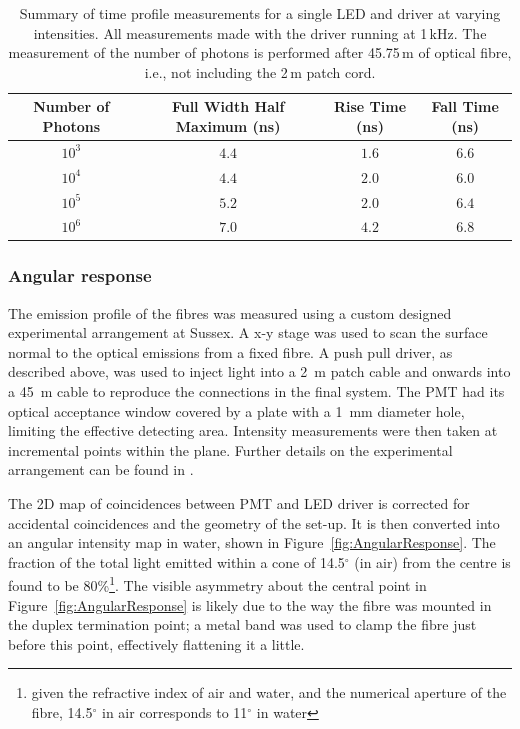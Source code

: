 \documentclass[12pt]{report}
\begin{document}
\begin{table}[t]
	\centering
	\begin{tabular}{| c | c | c | c |}
		\hline                        
		Number of Photons & Full Width Half Maximum (ns) & Rise Time (ns) & Fall Time (ns) \\ \hline \hline
		$10^{3}$ & $4.4$   & $1.6$ & $6.6$\\ \hline
		$10^{4}$ &$4.4$   & $2.0$ & $6.0$\\ \hline
		$10^{5}$ &$5.2$   & $2.0$ & $6.4$\\ \hline
		$10^{6}$ &$7.0$   & $4.2$ & $6.8$\\ \hline
	\end{tabular}
	\caption{Summary of time profile measurements for a single LED and driver at varying intensities. 
			All measurements made with the driver running at 1\,kHz. The measurement of the number of photons is performed after 45.75\,m of optical fibre, i.e., not including the 2\,m patch cord.}
	\label{tab:ixld} 
\end{table}

\subsubsection{Angular response}
The emission profile of the fibres was measured using a custom designed experimental arrangement at Sussex. A x-y stage was used to scan the surface normal to the optical emissions from a fixed fibre. A push pull driver, as described above, was used to inject light into a 2~m patch cable and onwards into a 45~m cable to reproduce the connections in the final system. The PMT had its optical acceptance window covered by a plate with a 1~mm diameter hole, limiting the effective detecting area. Intensity measurements were then taken at incremental points within the plane. Further details on the experimental arrangement can be found in \cite{Sinclair}. 

The 2D map of coincidences between PMT and LED driver is corrected for accidental coincidences and the geometry of the set-up. It is then converted into an angular intensity map in water, shown in Figure~\ref{fig:AngularResponse}. The fraction of the total light emitted within a cone of 14.5$^{\circ}$ (in air) from the centre is found to be 80\%\footnote{given the refractive index of air and water, and the numerical aperture of the fibre, 14.5$^{\circ}$  in air corresponds to 11$^{\circ}$ in water}. The visible asymmetry about the central point in Figure~\ref{fig:AngularResponse} is likely due to the way the fibre was mounted in the duplex termination point; a metal band was used to clamp the fibre just before this point, effectively flattening it a little. 
\end{document}
